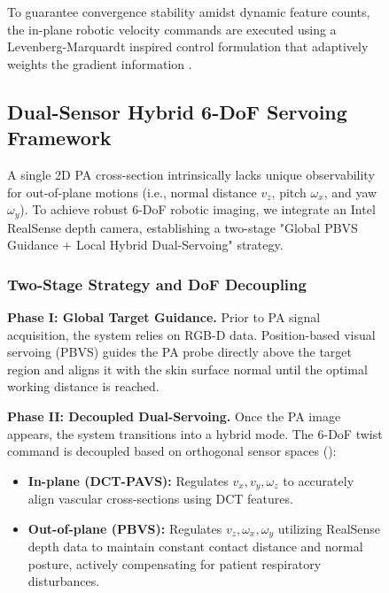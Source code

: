 \documentclass{article}
\begin{document}
\begin{figure}[htbp]
To guarantee convergence stability amidst dynamic feature counts, the in-plane robotic velocity commands are executed using a Levenberg-Marquardt inspired control formulation that adaptively weights the gradient information \cite{dame2009entropy,collewet2011photometric,marchand2019subspace}.

\subsection{Dual-Sensor Hybrid 6-DoF Servoing Framework}
\label{sec:Hybrid_Servoing}

A single 2D PA cross-section intrinsically lacks unique observability for out-of-plane motions (i.e., normal distance $v_z$, pitch $\omega_x$, and yaw $\omega_y$). To achieve robust 6-DoF robotic imaging, we integrate an Intel RealSense depth camera, establishing a two-stage "Global PBVS Guidance + Local Hybrid Dual-Servoing" strategy.

\subsubsection{Two-Stage Strategy and DoF Decoupling}
\textbf{Phase I: Global Target Guidance.} Prior to PA signal acquisition, the system relies on RGB-D data. Position-based visual servoing (PBVS) guides the PA probe directly above the target region and aligns it with the skin surface normal until the optimal working distance is reached.

\textbf{Phase II: Decoupled Dual-Servoing.} Once the PA image appears, the system transitions into a hybrid mode. The 6-DoF twist command is decoupled based on orthogonal sensor spaces ():
\begin{itemize}
    \item \textbf{In-plane (DCT-PAVS):} Regulates $v_x, v_y, \omega_z$ to accurately align vascular cross-sections using DCT features.
    \item \textbf{Out-of-plane (PBVS):} Regulates $v_z, \omega_x, \omega_y$ utilizing RealSense depth data to maintain constant contact distance and normal posture, actively compensating for patient respiratory disturbances.
\end{itemize}


\end{figure}
\end{document}
